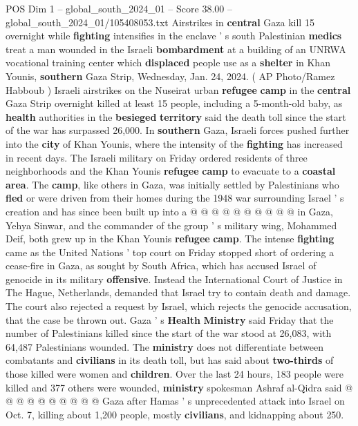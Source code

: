 \begin{textsample}{POS Dim 1 – global\_south\_2024\_01 – Score 38.00 – global\_south\_2024\_01/105408053.txt}  \label{ex:f1_pos_112}
Airstrikes in \textbf{central} Gaza kill 15 overnight while \textbf{fighting} intensifies in the enclave ' s south Palestinian \textbf{medics} treat a man wounded in the Israeli \textbf{bombardment} at a building of an UNRWA vocational training center which \textbf{displaced} people use as a \textbf{shelter} in Khan Younis, \textbf{southern} Gaza Strip, Wednesday, Jan. 24, 2024. ( AP Photo/Ramez Habboub ) Israeli airstrikes on the Nuseirat urban \textbf{refugee} \textbf{camp} in the \textbf{central} Gaza Strip overnight killed at least 15 people, including a 5-month-old baby, as \textbf{health} authorities in the \textbf{besieged} \textbf{territory} said the death toll since the start of the war has surpassed 26,000.
In \textbf{southern} Gaza, Israeli forces pushed further into the \textbf{city} of Khan Younis, where the intensity of the \textbf{fighting} has increased in recent days.
The Israeli military on Friday ordered residents of three neighborhoods and the Khan Younis \textbf{refugee} \textbf{camp} to evacuate to a \textbf{coastal} \textbf{area}.
The \textbf{camp}, like others in Gaza, was initially settled by Palestinians who \textbf{fled} or were driven from their homes during the 1948 war surrounding Israel ' s creation and has since been built up into a @ @ @ @ @ @ @ @ @ @ in Gaza, Yehya Sinwar, and the commander of the group ' s military wing, Mohammed Deif, both grew up in the Khan Younis \textbf{refugee} \textbf{camp}.
The intense \textbf{fighting} came as the United Nations ' top court on Friday stopped short of ordering a cease-fire in Gaza, as sought by South Africa, which has accused Israel of genocide in its military \textbf{offensive}.
Instead the International Court of Justice in The Hague, Netherlands, demanded that Israel try to contain death and damage.
The court also rejected a request by Israel, which rejects the genocide accusation, that the case be thrown out.
Gaza ' s \textbf{Health} \textbf{Ministry} said Friday that the number of Palestinians killed since the start of the war stood at 26,083, with 64,487 Palestinians wounded.
The \textbf{ministry} does not differentiate between combatants and \textbf{civilians} in its death toll, but has said about \textbf{two-thirds} of those killed were women and \textbf{children}.
Over the last 24 hours, 183 people were killed and 377 others were wounded, \textbf{ministry} spokesman Ashraf al-Qidra said @ @ @ @ @ @ @ @ @ @ Gaza after Hamas ' s unprecedented attack into Israel on Oct. 7, killing about 1,200 people, mostly \textbf{civilians}, and kidnapping about 250.

\end{textsample}
